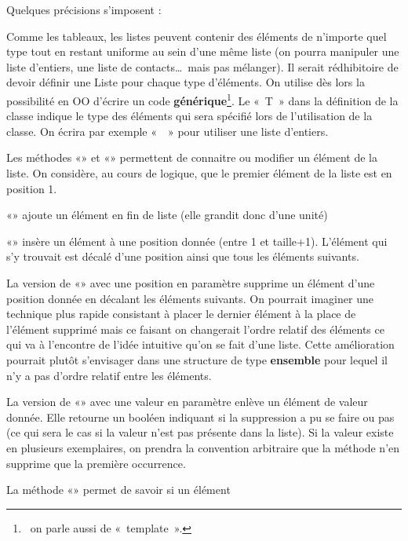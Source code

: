 \bigskip

Quelques précisions s’imposent :
\begin{liste}
	\item 
		Comme les tableaux, les listes peuvent contenir des éléments de
		n’importe quel type tout en restant uniforme au sein d’une même liste
		(on pourra manipuler une liste d’entiers, une liste de contacts\dots\ 
		mais pas mélanger). Il serait rédhibitoire de devoir définir une Liste
		pour chaque type d’éléments. On utilise dès lors la possibilité en OO
		d’écrire un code \textbf{générique}\footnote{\ on parle aussi de
		«~template~».}. Le «~T~» dans la définition de la classe indique le
		type des éléments qui sera spécifié lors de l’utilisation de la classe.
		On écrira par exemple «~\pseudocode{Liste d’entiers}~» pour
		utiliser une liste d’entiers.
	\item 
		Les méthodes «» et «»
		permettent de connaitre ou modifier un élément de la liste. On
		considère, au cours de logique, que le premier élément de 
		la liste est en position 1.
	\item 
		«» ajoute un élément en fin de liste (elle
		grandit donc d’une unité)
	\item 
		«» insère un élément à une position donnée
		(entre 1 et taille+1). L’élément qui s’y trouvait est décalé
		d'une position ainsi que tous les éléments suivants.
	\item 
		La version de «» avec une position en
		paramètre supprime un élément d'une position donnée en
		décalant les éléments suivants. On pourrait imaginer une technique plus
		rapide consistant à placer le dernier élément à la place de l’élément
		supprimé mais ce faisant on changerait l’ordre relatif des éléments ce
		qui va à l’encontre de l’idée intuitive qu’on se fait d’une liste.
		Cette amélioration pourrait plutôt s’envisager dans une structure de
		type \textbf{ensemble} pour lequel il n’y a pas d’ordre relatif entre
		les éléments.
	\item 
		La version de «» avec une valeur en
		paramètre enlève un élément de valeur donnée. Elle retourne un booléen
		indiquant si la suppression a pu se faire ou pas (ce qui sera le cas si
		la valeur n’est pas présente dans la liste). Si la valeur existe en
		plusieurs exemplaires, on prendra la convention arbitraire que
		la méthode n’en supprime que la première	occurrence.
	\item 
		La méthode «» permet de savoir si un élément

\end{liste}
